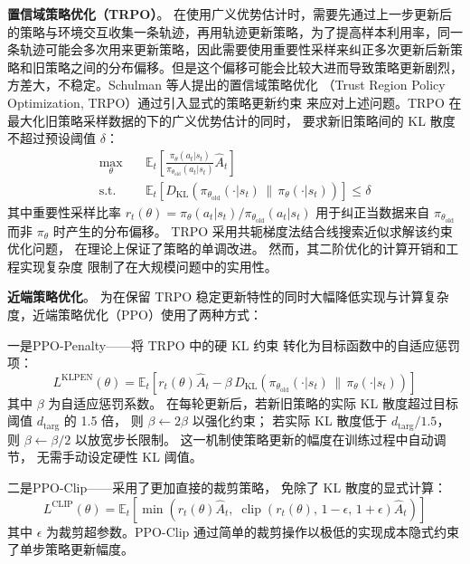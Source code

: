 \documentclass[12pt, a4paper, UTF8]{ctexart}
\numberwithin{equation}{section}
\begin{document}
\textbf{置信域策略优化（TRPO）}。
在使用广义优势估计时，需要先通过上一步更新后的策略与环境交互收集一条轨迹，再用轨迹更新策略，为了提高样本利用率，同一条轨迹可能会多次用来更新策略，因此需要使用重要性采样来纠正多次更新后新策略和旧策略之间的分布偏移。但是这个偏移可能会比较大进而导致策略更新剧烈，方差大，不稳定。Schulman 等人\cite{schulman2015trpo}提出的置信域策略优化
（Trust Region Policy Optimization, TRPO）通过引入显式的策略更新约束
来应对上述问题。TRPO 在最大化旧策略采样数据的下的广义优势估计的同时，
要求新旧策略间的 KL 散度不超过预设阈值 $\delta$：
\begin{equation}
  \begin{aligned}
    \max_{\theta}\quad & \mathbb{E}_{t}\left[ 
    \frac{\pi_{\theta}(a_t|s_t)}{\pi_{\theta_{\text{old}}}(a_t|s_t)} \hat{A}_t \right] \\
    \text{s.t.}\quad & \mathbb{E}_{t}\left[ 
    D_{\text{KL}}\left( \pi_{\theta_{\text{old}}}(\cdot|s_t) \,\|\, \pi_{\theta}(\cdot|s_t) \right) \right] \leq \delta
  \end{aligned}
  \label{eq:trpo}
\end{equation}
其中重要性采样比率 $r_t(\theta) = \pi_{\theta}(a_t|s_t) / \pi_{\theta_{\text{old}}}(a_t|s_t)$ 用于纠正当数据来自 $\pi_{\theta_{\text{old}}}$
而非 $\pi_{\theta}$ 时产生的分布偏移。
TRPO 采用共轭梯度法结合线搜索近似求解该约束优化问题，
在理论上保证了策略的单调改进\cite{schulman2015trpo}。
然而，其二阶优化的计算开销和工程实现复杂度
限制了在大规模问题中的实用性。

\textbf{近端策略优化}。
为在保留 TRPO 稳定更新特性的同时大幅降低实现与计算复杂度，近端策略优化（PPO）使用了两种方式：

一是PPO-Penalty——将 TRPO 中的硬 KL 约束
转化为目标函数中的自适应惩罚项：
\begin{equation}
  L^{\text{KLPEN}}(\theta) = \mathbb{E}_t\left[ 
  r_t(\theta) \hat{A}_t - \beta\, D_{\text{KL}}\left( \pi_{\theta_{\text{old}}}(\cdot|s_t) \,\|\, \pi_{\theta}(\cdot|s_t) \right) 
  \right]
  \label{eq:ppo_penalty}
\end{equation}
其中 $\beta$ 为自适应惩罚系数。
在每轮更新后，若新旧策略的实际 KL 散度超过目标阈值 $d_{\text{targ}}$ 的 1.5 倍，
则 $\beta \leftarrow 2\beta$ 以强化约束；
若实际 KL 散度低于 $d_{\text{targ}} / 1.5$，
则 $\beta \leftarrow \beta / 2$ 以放宽步长限制。
这一机制使策略更新的幅度在训练过程中自动调节，
无需手动设定硬性 KL 阈值。

二是PPO-Clip——采用了更加直接的裁剪策略，
免除了 KL 散度的显式计算：
\begin{equation}
  L^{\text{CLIP}}(\theta) = \mathbb{E}_t\left[ 
  \min\left( r_t(\theta) \hat{A}_t,\; 
  \operatorname{clip}\left(r_t(\theta),\, 1-\epsilon,\, 1+\epsilon\right) \hat{A}_t \right) 
  \right]
  \label{eq:ppo_clip}
\end{equation}
其中 $\epsilon$ 为裁剪超参数。PPO-Clip 通过简单的裁剪操作以极低的实现成本隐式约束了单步策略更新幅度。
\end{document}
